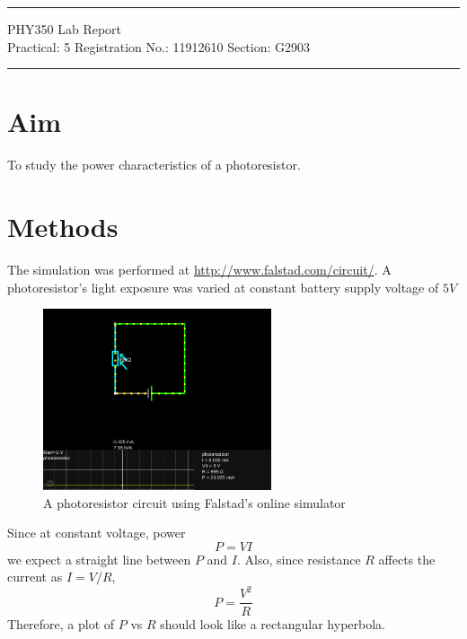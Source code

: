 \documentclass{article}
\begin{document}
	
	\author{Aayush Arya}
	\date{(Submitted: \today)}
	\title{}
	
	\maketitle
	
	\hrule
	\begin{center}
		PHY350 Lab Report\\
		Practical: 5 \quad Registration No.: 11912610 \quad Section: G2903
	\end{center}
	\hrule
	
	\section*{Aim}
	To study the power characteristics of a photoresistor.
	
	\section*{Methods}
	The simulation was performed at \url{http://www.falstad.com/circuit/}. A photoresistor's light exposure was varied at constant battery supply voltage of $5V$
	\begin{figure}[h]
		\centering
		\includegraphics[width=0.6\textwidth]{circuit_falstad}
		\caption{A photoresistor circuit using Falstad's online simulator}
	\end{figure}

	Since at constant voltage, power $$P = VI$$ we expect a straight line between $P$ and $I$. Also, since resistance $R$ affects the current as $I = V/R$, $$ P = \frac{V^2}{R}$$ Therefore, a plot of $P$ vs $R$ should look like a rectangular hyperbola.
	
\end{document}
